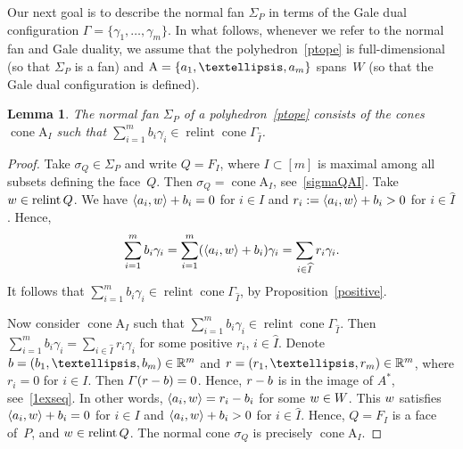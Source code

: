 \documentclass[a4paper]{amsart}
\newtheorem{lemma}[theorem]{Lemma}
\theoremstyle{definition}
\theoremstyle{remark}
\numberwithin{equation}{section}
\def\R{\mathbb R}
\def\R{\mathbb R}
\newcommand{\mb}[1]{{\textbf {\textit#1}}}
\renewcommand{\ge}{\geqslant}
\def\cone{\mathop{\mathrm{cone}}}
\def\relint{\mathop{\mathrm{relint}}}
\newcommand{\<}{\langle}
\renewcommand{\>}{\rangle}
\begin{document}

Our next goal is to describe the normal fan $\Sigma_P$ in terms of the Gale dual configuration $\Gamma=\{\gamma_1,\ldots,\gamma_m\}$. %
In what follows, whenever we refer to the normal fan and Gale duality, we assume that the polyhedron~\eqref{ptope} is full-dimensional (so that $\Sigma_P$ is a fan) and $\mathrm A=\{\mb a_1,\ldots,\mb a_m\}$ spans~$W$ (so that the Gale dual configuration is defined).

\begin{lemma}\label{normal1}
The normal fan $\Sigma_P$ of a polyhedron~\eqref{ptope} consists of the cones 
$\cone\mathrm A_I$ such that
$\sum_{i=1}^m b_i\gamma_i\in\relint\cone\Gamma_{\widehat I}$.
\end{lemma}
\begin{proof}
Take $\sigma_Q\in\Sigma_P$ and write $Q=F_I$, where $I\subset[m]$ is maximal among all subsets defining the face~$Q$. Then $\sigma_Q=\cone\mathrm A_I$, see~\eqref{sigmaQAI}. Take $\mb w\in\relint Q$. We have $\langle\mb a_i,\mb w\rangle+b_i=0$ for $i\in I$ and $r_i:=\langle\mb a_i,\mb w\rangle+b_i>0$ for $i\in\widehat I$. Hence,
\[
  \sum_{i=1}^m b_i\gamma_i=\sum_{i=1}^m(\langle\mb a_i,\mb w\rangle+b_i)\gamma_i=
  \sum_{i\in\widehat I}r_i\gamma_i.
\]
It follows that $\sum_{i=1}^m b_i\gamma_i\in\relint\cone\Gamma_{\widehat I}$, by Proposition~\ref{positive}.

Now consider $\cone\mathrm A_I$ such that $\sum_{i=1}^m b_i\gamma_i\in\relint\cone\Gamma_{\widehat I}$. Then $\sum_{i=1}^m b_i\gamma_i=\sum_{i\in\widehat I}r_i\gamma_i$ for some positive $r_i$, $i\in\widehat I$. Denote $\mb b=(b_1,\ldots,b_m)\in\R^m$ and $\mb r=(r_1,\ldots,r_m)\in\R^m$, where $r_i=0$ for $i\in I$. Then $\varGamma(\mb r-\mb b)=0$. Hence, $\mb r-\mb b$ is in the image of $A^*$, see~\eqref{1exseq}. In other words, $\langle\mb a_i,\mb w\rangle=r_i-b_i$ for some $\mb w\in W$. This $\mb w$ satisfies $\langle\mb a_i,\mb w\rangle+b_i=0$ for $i\in I$ and  $\langle\mb a_i,\mb w\rangle+b_i>0$ for $i\in\widehat I$. Hence, $Q=F_I$ is a face of~$P$, and $\mb w\in\relint Q$. The normal cone $\sigma_Q$ is precisely $\cone\mathrm A_I$.
\end{proof}
\end{document}
